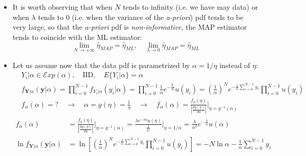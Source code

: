 \begin{itemize}
\begin{align*}
\frac{\partial \left[ \ln f_{\mathbf{Y}|\eta}(\mathbf{y}|\eta) + \ln f_\eta(\eta) \right]}{\partial \eta} &= \frac{N}{\eta} - \sum_{i=0}^{N-1} y_i + \frac{\partial \ln(\lambda e^{-\lambda \eta} u(\eta))}{\partial \eta} \\[10pt]
&= \frac{N}{\eta} - \sum_{i=0}^{N-1} y_i - \lambda = 0 \\[10pt]
\hat{\eta}_{MAP} = &\frac{N}{\sum_{i=0}^{N-1} y_i + \lambda} = \frac{1}{\frac{\lambda}{N} + \frac{1}{N} \sum_{i=0}^{N-1} y_i} \\[10pt]
= \frac{1}{Y_{SM} + \lambda/N}
\end{align*}
\item It is worth observing that when \(N\) tends to infinity (i.e. we have may data) or when \(\lambda\) tends to 0 (i.e. when the variance of the \textit{a-priori}) pdf tends to be very large, so that the \textit{a-priori} pdf is \textit{non-informative}, the MAP estimator tends to coincide with the ML estimator:
\[
\lim_{N\rightarrow+\infty}\hat{\eta}_{MAP} =\hat{\eta}_{ML}, \quad \lim_{\lambda\rightarrow0}\hat{\eta}_{MAP}=\hat{\eta}_{ML}
\]
\item Let us assume now that the data pdf is parametrized by \(\alpha = 1/\eta\) instead of \(\eta\):
\begin{align*}
&Y_i | \alpha \in \mathcal{E}xp(\alpha), \quad \text{IID}, \quad E\{Y_i|\alpha\} = \alpha \\[10pt]
&f_{\mathbf{Y}|\alpha}(\mathbf{y}|\alpha) = \prod_{i=0}^{N-1} f_{Y_i|\alpha}(y_i|\alpha) = \prod_{i=0}^{N-1} \frac{1}{\alpha} e^{-\frac{y_i}{\alpha}} u(y_i) = \left(\frac{1}{\alpha}\right)^N e^{-\frac{1}{\alpha}\sum_{i=0}^{N-1} y_i} \prod_{i=0}^{N-1} u(y_i) \\[10pt]
&f_\alpha(\alpha) = ? \quad \rightarrow \quad \alpha = g(\eta) = \frac{1}{\eta} \quad \rightarrow \quad f_\alpha(\alpha) = \frac{f_\eta(\eta)}{\left| \frac{d g(\eta)}{d \eta} \right|} \bigg|_{\eta=g^{-1}(\alpha)}
\end{align*}
\begin{align*}
f_\alpha(\alpha) &= \frac{f_\eta(\eta)}{\left| \frac{d g(\eta)}{d \eta} \right|} \bigg|_{\eta=g^{-1}(\alpha)} = \frac{\lambda e^{-\lambda \eta} u(\eta)}{\frac{1}{\eta^2}} \bigg|_{\eta=1/\alpha} = \frac{\lambda}{\alpha^2} e^{-\frac{\lambda}{\alpha}} u(\alpha) \\[10pt]
\ln f_{\mathbf{Y}|\alpha}(\mathbf{y}|\alpha) &= \ln \left[ \left(\frac{1}{\alpha}\right)^N e^{-\frac{1}{\alpha}\sum_{i=0}^{N-1} y_i} \prod_{i=0}^{N-1} u(y_i) \right] = -N \ln \alpha - \frac{1}{\alpha} \sum_{i=0}^{N-1} y_i \\[10pt]

\end{align*}
\end{itemize}
